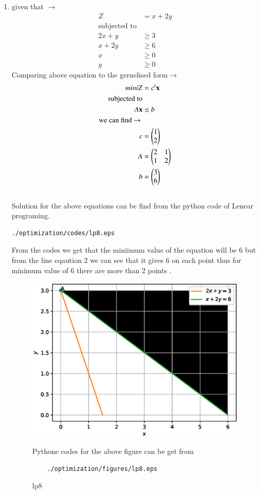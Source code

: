 \renewcommand{\theequation}{\theenumi}
\begin{enumerate}[label=\arabic*.,ref=\thesubsection.\theenumi]
\item  given that $\to$
\begin{align}
Z &= x + 2y
\\
\text{subjected to}
\\
2x + y &\geq 3
\\
x + 2y &\geq 6
\\
x  &\geq 0
\\
y &\geq 0
\end{align}
Comparing above equation to the gernelised form$\to$ 
\begin{align}
miniZ &= c^t \mathbf{x}
\\
\text{subjected to}
\\
A\mathbf{x} &\preceq b
\\ 
\text{we can find $\to$ }
\\
c &= \begin{pmatrix}1\\ 2\end{pmatrix}
\\
A &= \begin{pmatrix}2 & 1 \\ 1 & 2\end{pmatrix}
\\
b &= \begin{pmatrix}3\\6\end{pmatrix}
\end{align}\\
Solution for the above equations can be find from the python code of Lenear programing.\\
	\begin{lstlisting}
./optimization/codes/lp8.eps
\end{lstlisting}

From the codes we get that the miniimum value of the equation will be 6 but from the line  eqaution 2 we can see that  it gives 6 on each point thus for minimum  value of 6 there are more than 2 points .

\begin{figure}[!ht]
	\centering
	\includegraphics[width=\columnwidth]{./figures/lp8.eps}
	\caption{ lp8}
	\label{fig:lp8}
	Pythone codes for the above figure can be get from
	\begin{lstlisting}
	./optimization/figures/lp8.eps
	\end{lstlisting}	
\end{figure}
\end{enumerate}